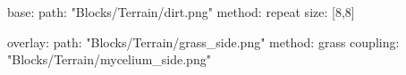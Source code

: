 base:
  path: "Blocks/Terrain/dirt.png"
  method: repeat
  size: [8,8]

overlay:
  path: "Blocks/Terrain/grass_side.png"
  method: grass
  coupling: "Blocks/Terrain/mycelium_side.png"